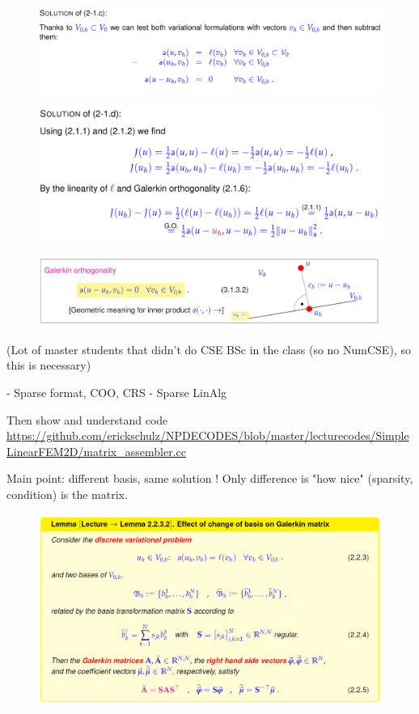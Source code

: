 \begin{figure}[h]
    \centering
    \includegraphics{week03/ex_2_1_c.png}
\end{figure}
\begin{figure}[h]
    \centering
    \includegraphics{week03/ex_2_1_d.png}
\end{figure}
\begin{figure}[h]
    \centering
    \includegraphics{week03/ex_G0.png}
\end{figure}

(Lot of master students that didn't do CSE BSc in the class (so no NumCSE), so this is necessary)

- Sparse format, COO, CRS
- Sparse LinAlg

Then show and understand code  \url{https://github.com/erickschulz/NPDECODES/blob/master/lecturecodes/SimpleLinearFEM2D/matrix_assembler.cc}


Main point: different basis, same solution ! Only difference is "how nice" (sparsity, condition) is the matrix.

\begin{figure}[h]
    \centering
    \includegraphics{week03/ex_galerkin_transformation.png}
\end{figure}



